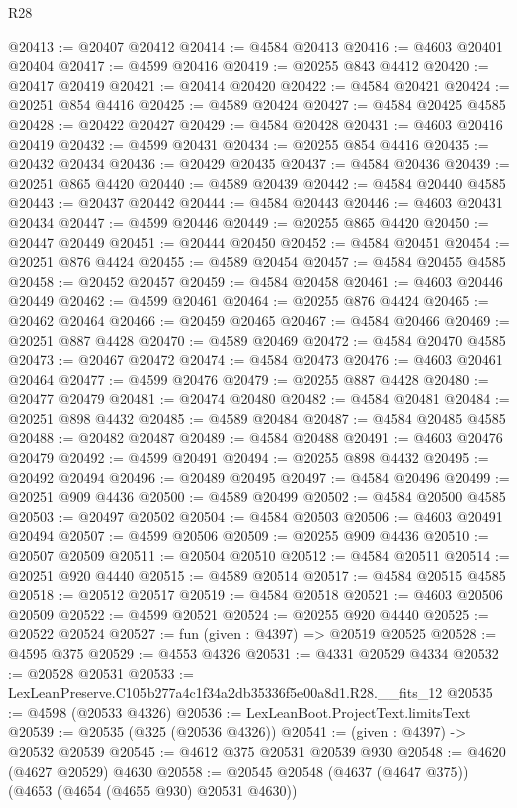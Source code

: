 \begin{lexlean}{R28}
\begin{coremodule}
@20413 := @20407 @20412
@20414 := @4584 @20413
@20416 := @4603 @20401 @20404
@20417 := @4599 @20416
@20419 := @20255 @843 @4412
@20420 := @20417 @20419
@20421 := @20414 @20420
@20422 := @4584 @20421
@20424 := @20251 @854 @4416
@20425 := @4589 @20424
@20427 := @4584 @20425 @4585
@20428 := @20422 @20427
@20429 := @4584 @20428
@20431 := @4603 @20416 @20419
@20432 := @4599 @20431
@20434 := @20255 @854 @4416
@20435 := @20432 @20434
@20436 := @20429 @20435
@20437 := @4584 @20436
@20439 := @20251 @865 @4420
@20440 := @4589 @20439
@20442 := @4584 @20440 @4585
@20443 := @20437 @20442
@20444 := @4584 @20443
@20446 := @4603 @20431 @20434
@20447 := @4599 @20446
@20449 := @20255 @865 @4420
@20450 := @20447 @20449
@20451 := @20444 @20450
@20452 := @4584 @20451
@20454 := @20251 @876 @4424
@20455 := @4589 @20454
@20457 := @4584 @20455 @4585
@20458 := @20452 @20457
@20459 := @4584 @20458
@20461 := @4603 @20446 @20449
@20462 := @4599 @20461
@20464 := @20255 @876 @4424
@20465 := @20462 @20464
@20466 := @20459 @20465
@20467 := @4584 @20466
@20469 := @20251 @887 @4428
@20470 := @4589 @20469
@20472 := @4584 @20470 @4585
@20473 := @20467 @20472
@20474 := @4584 @20473
@20476 := @4603 @20461 @20464
@20477 := @4599 @20476
@20479 := @20255 @887 @4428
@20480 := @20477 @20479
@20481 := @20474 @20480
@20482 := @4584 @20481
@20484 := @20251 @898 @4432
@20485 := @4589 @20484
@20487 := @4584 @20485 @4585
@20488 := @20482 @20487
@20489 := @4584 @20488
@20491 := @4603 @20476 @20479
@20492 := @4599 @20491
@20494 := @20255 @898 @4432
@20495 := @20492 @20494
@20496 := @20489 @20495
@20497 := @4584 @20496
@20499 := @20251 @909 @4436
@20500 := @4589 @20499
@20502 := @4584 @20500 @4585
@20503 := @20497 @20502
@20504 := @4584 @20503
@20506 := @4603 @20491 @20494
@20507 := @4599 @20506
@20509 := @20255 @909 @4436
@20510 := @20507 @20509
@20511 := @20504 @20510
@20512 := @4584 @20511
@20514 := @20251 @920 @4440
@20515 := @4589 @20514
@20517 := @4584 @20515 @4585
@20518 := @20512 @20517
@20519 := @4584 @20518
@20521 := @4603 @20506 @20509
@20522 := @4599 @20521
@20524 := @20255 @920 @4440
@20525 := @20522 @20524
@20527 := fun (given : @4397) => @20519 @20525
@20528 := @4595 @375
@20529 := @4553 @4326
@20531 := @4331 @20529 @4334
@20532 := @20528 @20531
@20533 := LexLeanPreserve.C105b277a4c1f34a2db35336f5e00a8d1.R28.__fits_12
@20535 := @4598 (@20533 @4326)
@20536 := LexLeanBoot.ProjectText.limitsText
@20539 := @20535 (@325 (@20536 @4326))
@20541 := (given : @4397) -> @20532 @20539
@20545 := @4612 @375 @20531 @20539 @930
@20548 := @4620 (@4627 @20529) @4630
@20558 := @20545 @20548 (@4637 (@4647 @375)) (@4653 (@4654 (@4655 @930) @20531 @4630))

\end{coremodule}
\end{lexlean}
